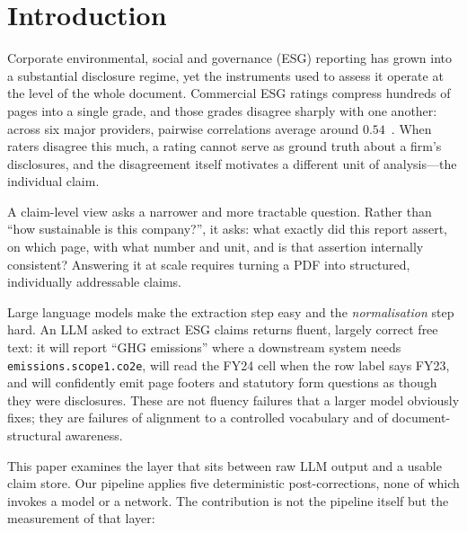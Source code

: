 \documentclass[3p,times]{elsarticle}
\begin{document}
\section{Introduction}

Corporate environmental, social and governance (ESG) reporting has grown into a
substantial disclosure regime, yet the instruments used to assess it operate at
the level of the whole document. Commercial ESG ratings compress hundreds of
pages into a single grade, and those grades disagree sharply with one another:
across six major providers, pairwise correlations average around
$0.54$~\cite{berg2022aggregate}. When raters disagree this much, a rating cannot
serve as ground truth about a firm's disclosures, and the disagreement itself
motivates a different unit of analysis---the individual claim.

A claim-level view asks a narrower and more tractable question. Rather than
``how sustainable is this company?'', it asks: what exactly did this report
assert, on which page, with what number and unit, and is that assertion
internally consistent? Answering it at scale requires turning a PDF into
structured, individually addressable claims.

Large language models make the extraction step easy and the \emph{normalisation}
step hard. An LLM asked to extract ESG claims returns fluent, largely correct
free text: it will report ``GHG emissions'' where a downstream system needs
\texttt{emissions.scope1.co2e}, will read the FY24 cell when the row label says
FY23, and will confidently emit page footers and statutory form questions as
though they were disclosures. These are not fluency failures that a larger model
obviously fixes; they are failures of alignment to a controlled vocabulary and of
document-structural awareness.

This paper examines the layer that sits between raw LLM output and a usable claim
store. Our pipeline applies five deterministic post-corrections, none of which
invokes a model or a network. The contribution is not the pipeline itself but the
measurement of that layer:
\end{document}
